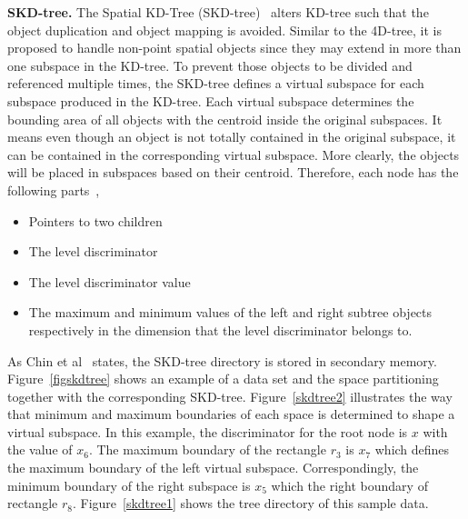 \documentclass[a4paper,12pt]{article}
\begin{document}
\textbf{SKD-tree.} The Spatial KD-Tree (SKD-tree)~\cite{skdtree} alters KD-tree such that the object duplication and object mapping is avoided. Similar to the 4D-tree, it is proposed to handle non-point spatial objects since they may extend in more than one subspace in the KD-tree. To prevent those objects to be divided and referenced multiple times, the SKD-tree defines a virtual subspace for each subspace produced in the KD-tree. Each virtual subspace determines the bounding area of all objects with the centroid inside the original subspaces. It means even though an object is not totally contained in the original subspace, it can be contained in the corresponding virtual subspace. More clearly, the objects will be placed in subspaces based on their centroid. Therefore, each node has the following parts~\cite{skdtreebook},
\begin{itemize}
\item Pointers to two children
\item The level discriminator
\item The level discriminator value
\item The maximum and minimum values of the left and right subtree objects respectively in the dimension that the level discriminator belongs to.
\end{itemize}    
As Chin et al~\cite{survey} states, the SKD-tree directory is stored in secondary memory. Figure~\ref{figskdtree} shows an example of a data set and the space partitioning together with the corresponding SKD-tree. Figure~\ref{skdtree2} illustrates the way that minimum and maximum boundaries of each space is determined to shape a virtual subspace. In this example, the discriminator for the root node is $x$ with the value of $x_6$.
The maximum boundary of the rectangle $r_3$ is $x_7$ which defines the maximum boundary of the left virtual subspace. Correspondingly, the minimum boundary of the right subspace is $x_5$ which the right boundary of rectangle $r_8$. Figure~\ref{skdtree1} shows the tree directory of this sample data.
\end{document}
